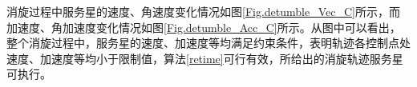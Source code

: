 \documentclass[lang=chs, degree=master, blindreview=false, winfonts=true]{yanputhesis}
\begin{document}
消旋过程中服务星的速度、角速度变化情况如图\ref{Fig.detumble_Vec_C}所示，而加速度、角加速度变化情况如图\ref{Fig.detumble_Acc_C}所示。从图中可以看出，整个消旋过程中，服务星的速度、加速度等均满足约束条件，表明轨迹各控制点处速度、加速度等均小于限制值，算法\ref{retime}可行有效，所给出的消旋轨迹服务星可执行。
\end{document}
